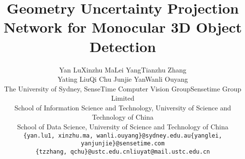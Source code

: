 \documentclass[10pt,twocolumn,letterpaper]{article}
\begin{document}
\title{Geometry Uncertainty Projection Network for Monocular 3D Object Detection}
\begin{small}
\author{Yan Lu\quad Xinzhu Ma\quad Lei Yang\quad Tianzhu Zhang\\ Yating Liu\quad Qi Chu\quad 
Junjie Yan\quad Wanli Ouyang\\
The University of Sydney, SenseTime Computer Vision Group\quad Sensetime Group Limited\\
School of Information Science and Technology, University of Science and Technology of China\\
School of Data Science, University of Science and Technology of China\\
{\tt\small \{yan.lu1, xinzhu.ma, wanli.ouyang\}@sydney.edu.au\quad \{yanglei, yanjunjie\}@sensetime.com}\\
{\tt\small \{tzzhang, qchu\}@ustc.edu.cn\quad liuyat@mail.ustc.edu.cn}
}
\end{small}
\maketitle
\renewcommand{\thefootnote}{}
\renewcommand{\thefootnote}{*}
\renewcommand{\thefootnote}{\Letter}
\renewcommand{\thefootnote}{}
\renewcommand{\thefootnote}{1}
\end{document}
